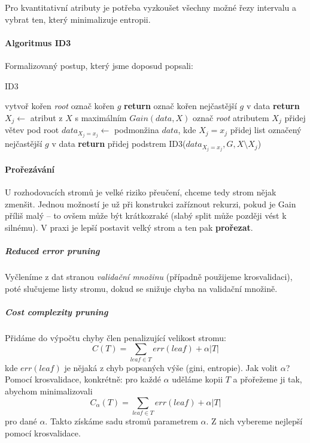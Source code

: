 \documentclass[11pt]{report} %
\numberwithin{equation}{section}
\begin{document}
Pro kvantitativní atributy je potřeba vyzkoušet všechny možné řezy intervalu a vybrat ten, který minimalizuje entropii.

\paragraph{Algoritmus ID3}
Formalizovaný postup, který jsme doposud popsali:
\bigskip
\begin{algorithm}[H]
	\caption{ID3}
	\begin{algorithmic}[1]
			\State vytvoř kořen \textit{root}
				\State označ kořen $g$
				\State \textbf{return}
			\EndIf
				\State označ kořen nejčastější $g$ v data
				\State \textbf{return}
			\EndIf
			\State $X_j \gets$ atribut z $X$ s maximálním $Gain(data,X)$
			\State označ \textit{root} atributem $X_j$
				\State přidej větev pod root
				\State $data_{X_j = x_j} \gets$ podmonžina $data$, kde $X_j = x_j$
					\State přidej list označený nejčastější $g$ v data
					\State \textbf{return}	
				\EndIf
				\State přidej podstrem ID3($data_{X_j=x_j}, G, X \setminus {X_j}$)
			\EndFor
		\EndFunction
	\end{algorithmic}
\end{algorithm}	

\paragraph{Prořezávání}
U rozhodovacích stromů je velké riziko přeučení, chceme tedy strom nějak zmenšit. Jednou možností je už při konstrukci zaříznout rekurzi, pokud je Gain příliš malý -- to ovšem může být krátkozraké (slabý split může později vést k silnému). V praxi je lepší postavit velký strom a ten pak \textbf{prořezat}.

\subparagraph{Reduced error pruning}
Vyčleníme z dat stranou \textit{validační množinu} (případně použijeme krosvalidaci), poté slučujeme listy stromu, dokud se snižuje chyba na validační množině.

\subparagraph{Cost complexity pruning}
Přidáme do výpočtu chyby člen penalizující velikost stromu:
$$C(T) = \sum_{leaf \in T} err(leaf) + \alpha|T|$$ 
kde $err(leaf)$ je nějaká z chyb popsaných výše (gini, entropie). Jak volit $\alpha$? Pomocí krosvalidace, konkrétně: pro každé $\alpha$ uděláme kopii $T$ a přořežeme ji tak, abychom minimalizovali
$$C_\alpha(T) = \sum_{leaf \in T} err(leaf) + \alpha|T|$$ 
pro dané $\alpha$. Takto získáme sadu stromů  parametrem $\alpha$. Z nich vybereme nejlepší pomocí krosvalidace.
\end{document}
